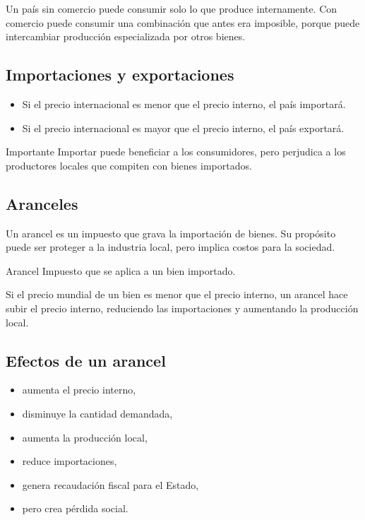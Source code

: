 \begin{ejemplo}
Un país sin comercio puede consumir solo lo que produce internamente. Con comercio puede consumir una combinación que antes era imposible, porque puede intercambiar producción especializada por otros bienes.
\end{ejemplo}

\subsection{Importaciones y exportaciones}

\begin{itemize}
    \item Si el precio internacional es menor que el precio interno, el país importará.
    \item Si el precio internacional es mayor que el precio interno, el país exportará.
\end{itemize}

\begin{observacion}{Importante}
Importar puede beneficiar a los consumidores, pero perjudica a los productores locales que compiten con bienes importados.
\end{observacion}

\subsection{Aranceles}

Un arancel es un impuesto que grava la importación de bienes. Su propósito puede ser proteger a la industria local, pero implica costos para la sociedad.

\begin{concepto}{Arancel}
Impuesto que se aplica a un bien importado.
\end{concepto}

\begin{ejemplo}
Si el precio mundial de un bien es menor que el precio interno, un arancel hace subir el precio interno, reduciendo las importaciones y aumentando la producción local.
\end{ejemplo}

\subsection{Efectos de un arancel}

\begin{itemize}
    \item aumenta el precio interno,
    \item disminuye la cantidad demandada,
    \item aumenta la producción local,
    \item reduce importaciones,
    \item genera recaudación fiscal para el Estado,
    \item pero crea pérdida social.
\end{itemize}


